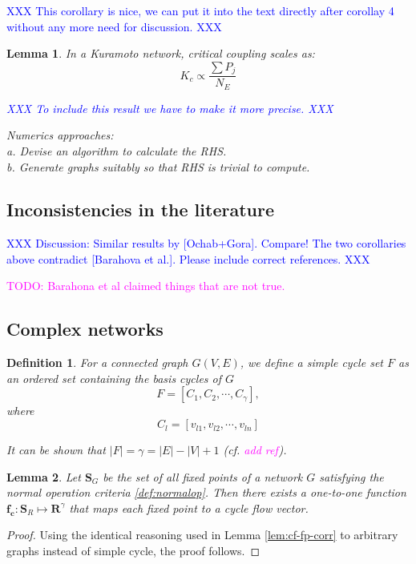 \documentclass[10pt,aps,pre,preprint,superscriptaddress]{revtex4-1}
\newcommand{\dirk}[1]{\textcolor{blue}{#1}}
\newcommand{\debsankha}[1]{\textcolor{magenta}{#1}}
\newtheorem{defn}[thm]{Definition}
\renewcommand{\vec}[1]{\boldsymbol{#1}}
\newtheorem{lemma}{Lemma}
\begin{document}
\dirk{XXX This corollary is nice, we can put it into the text directly after corollay 4 
without any more need for discussion. XXX}

\begin{lemma}
In a Kuramoto network, critical coupling scales as:
\[
K_c\propto \frac{\sum P_j}{N_E}
\]

\dirk{XXX To include this result we have to make it more precise. XXX}

Numerics approaches: \\
a. Devise an algorithm to calculate the RHS.   \\
b. Generate graphs suitably so that RHS is trivial to compute.  
\end{lemma}



\subsection{Inconsistencies in the literature}

\dirk{XXX Discussion: Similar results by [Ochab+Gora]. Compare!
The two corollaries above contradict [Barahova et al.]. Please include correct references. XXX}

\debsankha{TODO: Barahona et al claimed things that are not true.}  



\subsection{Complex networks}

\begin{defn}
For a connected  graph $G(V,E)$, we define a \emph{simple cycle set} $F$ as an 
ordered set containing the basis cycles of $G$
\[
F=\left[C_1, C_2,\cdots, C_{\gamma} \right],
\]
where 
\[
C_l=\left[v_{l1},v_{l2},\cdots, v_{ln}\right]
\]


It can be shown that 
$|F|=\gamma=|E|-|V|+1$ (cf. \debsankha{add ref}).  
\end{defn}


\begin{lemma}
\label{lem:cf-fp-corr-planar}
Let $\mathbf{S}_G$ be the set of all fixed points of a network $G$ 
satisfying the normal operation criteria \eqref{def:normalop}.
Then there exists a one-to-one function $\vec{f_c}:\mathbf{S}_R\mapsto \mathbf{R}^{\gamma}$ 
that maps each fixed point to a \emph{cycle flow vector}.  

\end{lemma}
\begin{proof}
Using the identical reasoning used in Lemma \ref{lem:cf-fp-corr} to arbitrary 
graphs instead of simple cycle, the proof follows.  
\end{proof}
\end{document}
